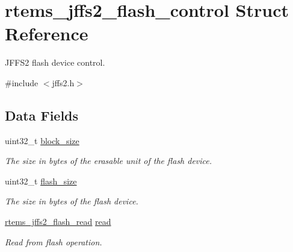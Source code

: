 \hypertarget{structrtems__jffs2__flash__control}{}\section{rtems\+\_\+jffs2\+\_\+flash\+\_\+control Struct Reference}
\label{structrtems__jffs2__flash__control}


J\+F\+F\+S2 flash device control.  




{\ttfamily \#include $<$jffs2.\+h$>$}

\subsection*{Data Fields}
\begin{DoxyCompactItemize}
\item 
\mbox{\label{structrtems__jffs2__flash__control_ab8fcc354b71018981e37a4a38fc6c2d4}} 
uint32\+\_\+t \mbox{\hyperlink{structrtems__jffs2__flash__control_ab8fcc354b71018981e37a4a38fc6c2d4}{block\+\_\+size}}
\begin{DoxyCompactList}\small\item\em The size in bytes of the erasable unit of the flash device. \end{DoxyCompactList}\item 
uint32\+\_\+t \mbox{\hyperlink{structrtems__jffs2__flash__control_a202e3e645b838a0e82658a71de479963}{flash\+\_\+size}}
\begin{DoxyCompactList}\small\item\em The size in bytes of the flash device. \end{DoxyCompactList}\item 
\mbox{\label{structrtems__jffs2__flash__control_a31e89c3a937ea56e5cb1d51b8df0ccdc}} 
\mbox{\hyperlink{group__JFFS2_ga1865e220fec00e764a6284642d2f46df}{rtems\+\_\+jffs2\+\_\+flash\+\_\+read}} \mbox{\hyperlink{structrtems__jffs2__flash__control_a31e89c3a937ea56e5cb1d51b8df0ccdc}{read}}
\begin{DoxyCompactList}\small\item\em Read from flash operation. \end{DoxyCompactList}\item 
\mbox{\label{structrtems__jffs2__flash__control_ab34264da7c8f5470adc2108117e11382}} 

\end{DoxyCompactItemize}
